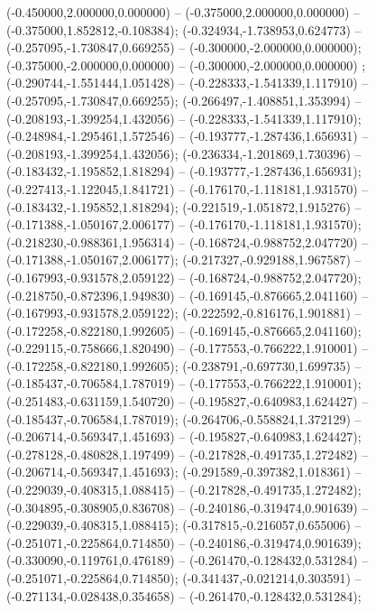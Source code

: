 (-0.450000,2.000000,0.000000) -- (-0.375000,2.000000,0.000000) -- (-0.375000,1.852812,-0.108384);
 (-0.324934,-1.738953,0.624773) -- (-0.257095,-1.730847,0.669255) -- (-0.300000,-2.000000,0.000000);
 (-0.375000,-2.000000,0.000000) -- (-0.300000,-2.000000,0.000000) ;
 (-0.290744,-1.551444,1.051428) -- (-0.228333,-1.541339,1.117910) -- (-0.257095,-1.730847,0.669255);
 (-0.266497,-1.408851,1.353994) -- (-0.208193,-1.399254,1.432056) -- (-0.228333,-1.541339,1.117910);
 (-0.248984,-1.295461,1.572546) -- (-0.193777,-1.287436,1.656931) -- (-0.208193,-1.399254,1.432056);
 (-0.236334,-1.201869,1.730396) -- (-0.183432,-1.195852,1.818294) -- (-0.193777,-1.287436,1.656931);
 (-0.227413,-1.122045,1.841721) -- (-0.176170,-1.118181,1.931570) -- (-0.183432,-1.195852,1.818294);
 (-0.221519,-1.051872,1.915276) -- (-0.171388,-1.050167,2.006177) -- (-0.176170,-1.118181,1.931570);
 (-0.218230,-0.988361,1.956314) -- (-0.168724,-0.988752,2.047720) -- (-0.171388,-1.050167,2.006177);
 (-0.217327,-0.929188,1.967587) -- (-0.167993,-0.931578,2.059122) -- (-0.168724,-0.988752,2.047720);
 (-0.218750,-0.872396,1.949830) -- (-0.169145,-0.876665,2.041160) -- (-0.167993,-0.931578,2.059122);
 (-0.222592,-0.816176,1.901881) -- (-0.172258,-0.822180,1.992605) -- (-0.169145,-0.876665,2.041160);
 (-0.229115,-0.758666,1.820490) -- (-0.177553,-0.766222,1.910001) -- (-0.172258,-0.822180,1.992605);
 (-0.238791,-0.697730,1.699735) -- (-0.185437,-0.706584,1.787019) -- (-0.177553,-0.766222,1.910001);
 (-0.251483,-0.631159,1.540720) -- (-0.195827,-0.640983,1.624427) -- (-0.185437,-0.706584,1.787019);
 (-0.264706,-0.558824,1.372129) -- (-0.206714,-0.569347,1.451693) -- (-0.195827,-0.640983,1.624427);
 (-0.278128,-0.480828,1.197499) -- (-0.217828,-0.491735,1.272482) -- (-0.206714,-0.569347,1.451693);
 (-0.291589,-0.397382,1.018361) -- (-0.229039,-0.408315,1.088415) -- (-0.217828,-0.491735,1.272482);
 (-0.304895,-0.308905,0.836708) -- (-0.240186,-0.319474,0.901639) -- (-0.229039,-0.408315,1.088415);
 (-0.317815,-0.216057,0.655006) -- (-0.251071,-0.225864,0.714850) -- (-0.240186,-0.319474,0.901639);
 (-0.330090,-0.119761,0.476189) -- (-0.261470,-0.128432,0.531284) -- (-0.251071,-0.225864,0.714850);
 (-0.341437,-0.021214,0.303591) -- (-0.271134,-0.028438,0.354658) -- (-0.261470,-0.128432,0.531284);
